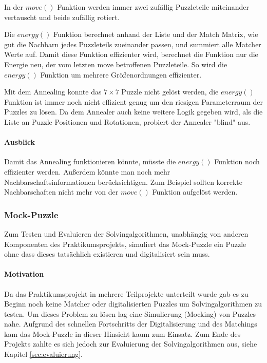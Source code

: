In der $move()$ Funktion werden immer zwei zufällig Puzzleteile miteinander vertauscht und beide zufällig rotiert.

Die $energy()$ Funktion berechnet anhand der Liste und der Match Matrix, wie gut die Nachbarn jedes Puzzleteils zueinander passen, und summiert alle Matcher Werte auf. Damit diese Funktion effizienter wird, berechnet die Funktion nur die Energie neu, der vom letzten move betroffenen Puzzleteile. So wird die $energy()$ Funktion um mehrere Größenordnungen effizienter.

Mit dem Annealing konnte das $ 7 \times 7$ Puzzle nicht gelöst werden, die $energy()$ Funktion ist immer noch nicht effizient genug um den riesigen Parameterraum der Puzzles zu lösen. Da dem Annealer auch keine weitere Logik gegeben wird, als die Liste an Puzzle Positionen und Rotationen, probiert der Annealer "blind" aus.

\paragraph{Ausblick}
Damit das Annealing funktionieren könnte, müsste die $energy()$ Funktion noch effizienter werden. Außerdem könnte man noch mehr Nachbarschaftsinformationen berücksichtigen. Zum Beispiel sollten korrekte Nachbarschaften nicht mehr von der $move()$ Funktion aufgelöst werden. 



\subsubsection[Mock-Puzzle]{Mock-Puzzle } \label{sec:mockpuzzle}
Zum Testen und Evaluieren der Solvingalgorithmen, unabhängig von anderen Komponenten des Praktikumsprojekts, simuliert das Mock-Puzzle ein Puzzle ohne dass dieses tatsächlich existieren und digitalisiert sein muss.

\paragraph{Motivation}
Da das Praktikumsprojekt in mehrere Teilprojekte unterteilt wurde gab es zu Beginn noch keine Matcher oder digitalisierten Puzzles um Solvingalgorithmen zu testen.
Um dieses Problem zu lösen lag eine Simulierung (Mocking) von Puzzles nahe.
Aufgrund des schnellen Fortschritts der Digitalisierung und des Matchings kam das Mock-Puzzle in dieser Hinsicht kaum zum Einsatz.
Zum Ende des Projekts zahlte es sich jedoch zur Evaluierung der Solvingalgorithmen aus, siehe Kapitel \ref{sec:evaluierung}.

